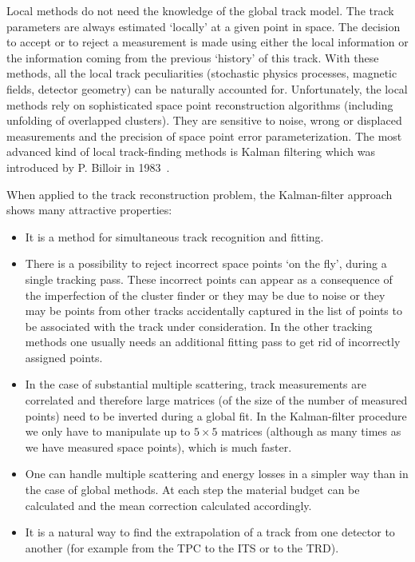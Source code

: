 \documentclass[12pt,a4paper,twoside]{article}
\begin{document}
Local methods do not need the knowledge of the global track model.
The track parameters are always estimated `locally' at a given point
in space.  The decision to accept or to reject a measurement is made using
either the local information or the information coming from the previous
`history' of this track.  With these methods, all the local track
peculiarities (stochastic physics processes, magnetic fields, detector
geometry) can be naturally accounted for.  Unfortunately, the local methods
rely on sophisticated space point reconstruction algorithms (including 
unfolding of overlapped clusters). They are sensitive to noise, wrong or
displaced measurements and the precision of space point error parameterization.
The most advanced kind of local track-finding methods is Kalman
filtering which was introduced by P. Billoir in 1983~\cite{MC:billoir}.



When applied to the track reconstruction problem, the Kalman-filter
approach shows many attractive properties:
\begin{itemize}

\item It is a method for simultaneous track recognition and
  fitting.

\item There is a possibility to reject incorrect space points `on
  the fly', during a single tracking pass. These incorrect points can
  appear as a consequence of the imperfection of the cluster finder or
  they may be due to noise or they may be points from other tracks
  accidentally captured in the list of points to be associated with
  the track under consideration. In the other tracking methods one
  usually needs an additional fitting pass to get rid of incorrectly
  assigned points.

\item In the case of substantial multiple scattering, track
  measurements are correlated and therefore large matrices (of the
  size of the number of measured points) need to be inverted during
  a global fit. In the Kalman-filter procedure we only have to
  manipulate up to $5 \times 5$ matrices (although as many times as
  we have measured space points), which is much faster.

\item One can handle multiple scattering and
  energy losses in a simpler way than in the case of global
  methods. At each step the material budget can be calculated and the
  mean correction calculated accordingly.

\item It is a natural way to find the extrapolation
  of a track from one detector to another (for example from the TPC
  to the ITS or to the TRD).
\end{itemize}
\end{document}
